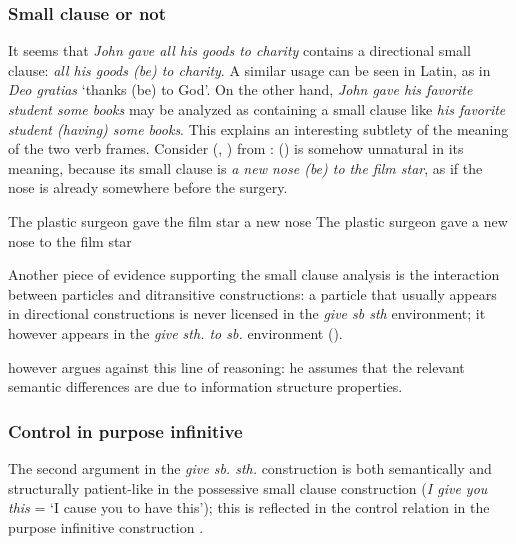 \documentclass[UTF8, a4paper, oneside, scheme=plain, 12pt]{ctexbook}
\newcommand*{\citepage}[1]{p.~{#1}}
\newcommand{\form}[1]{\emph{#1}}
\newcommand{\translate}[1]{`#1'}
\begin{document}
\subsubsection{Small clause or not}

It seems that \form{John gave all his goods to charity} contains a directional small clause:
\form{all his goods (be) to charity}.
A similar usage can be seen in Latin, as in \form{Deo gratias} \translate{thanks (be) to God}.
On the other hand, \form{John gave his favorite student some books}
may be analyzed as containing a small clause like \form{his favorite student (having) some books}.
This explains an interesting subtlety of the meaning of the two verb frames.
Consider (, )
from \citet[\citepage{81}]{devine2006latin}:
() is somehow unnatural in its meaning, 
because its small clause is \form{a new nose (be) to the film star}, 
as if the nose is already somewhere before the surgery.

\begin{exe}
    \ex\label{ex:valence.give.1} The plastic surgeon gave the film star a new nose 
    \ex\label{ex:valence.give.2} The plastic surgeon gave a new nose to the film star
\end{exe}

Another piece of evidence supporting the small clause analysis 
is the interaction between particles and ditransitive constructions: 
a particle that usually appears in directional constructions 
is never licensed in the \form{give sb sth} environment; 
it however appears in the \form{give sth. to sb.} environment
().

\citet{baker1997thematic} however argues against this line of reasoning: 
he assumes that the relevant semantic differences are due to information structure properties.


\subsubsection{Control in purpose infinitive} 

The second argument in the \form{give sb. sth.} construction 
is both semantically and structurally patient-like in the possessive small clause construction 
(\form{I give you this} = \translate{I cause you to have this}); 
this is reflected in the control relation in the purpose infinitive construction \citep[\citepage{250}]{cgel}.
\end{document}
